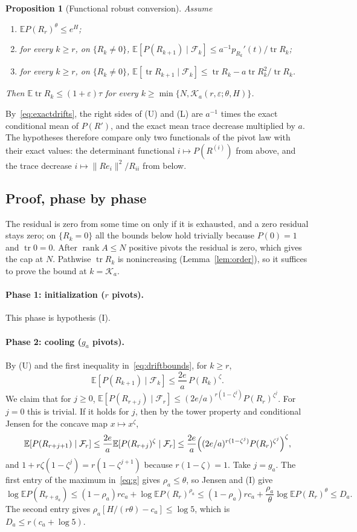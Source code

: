 \documentclass[11pt]{article}
\newtheorem{proposition}[theorem]{Proposition}
\theoremstyle{definition}\newtheorem{definition}[theorem]{Definition}
\theoremstyle{remark}\newtheorem{remark}[theorem]{Remark}
\newcommand{\E}{\mathbb E}
\newcommand{\eps}{\varepsilon}
\newcommand{\tr}{\operatorname{tr}}
\newcommand{\rank}{\operatorname{rank}}
\newcommand{\calK}{\mathcal K}
\newcommand{\calF}{\mathcal F}
\newcommand{\1}{\mathbf 1}
\begin{document}
\begin{proposition}[Functional robust conversion]\label{prop:functional}
Assume
\begin{enumerate}[label=\textup{(\Roman*)},leftmargin=2.2em]
\item[\textup{(I)}] $\E P(R_r)^\theta\le e^H$;
\item[\textup{(U)}] for every $k\ge r$, on $\{R_k\ne0\}$,
 $\E[P(R_{k+1})\mid\calF_k]\le a^{-1}p_{R_k}'(t)/\tr R_k$;
\item[\textup{(L)}] for every $k\ge r$, on $\{R_k\ne0\}$,
 $\E[\tr R_{k+1}\mid\calF_k]\le\tr R_k-a\tr R_k^2/\tr R_k$.
\end{enumerate}
Then $\E\tr R_k\le(1+\eps)\tau$ for every
$k\ge\min\{N,\calK_a(r,\eps;\theta,H)\}$.
\end{proposition}

By~\eqref{eq:exactdrifts}, the right sides of (U) and (L) are $a^{-1}$
times the exact conditional mean of $P(R')$, and the exact mean trace
decrease multiplied by $a$. The hypotheses therefore compare only two
functionals of the pivot law with their exact values: the determinant
functional $i\mapsto P(R^{(i)})$ from above, and the trace decrease
$i\mapsto\|Re_i\|^2/R_{ii}$ from below.

\subsection{Proof, phase by phase}
The residual is zero from some time on only if it is exhausted, and a
zero residual stays zero; on $\{R_k=0\}$ all the bounds below hold
trivially because $P(0)=1$ and $\tr 0=0$. After $\rank A\le N$
positive pivots the residual is zero, which gives the cap at $N$.
Pathwise $\tr R_k$ is nonincreasing (Lemma~\ref{lem:order}), so it
suffices to prove the bound at $k=\calK_a$.

\paragraph{Phase 1: initialization ($r$ pivots).}
This phase is hypothesis (I).

\paragraph{Phase 2: cooling ($g_a$ pivots).}
By (U) and the first inequality in~\eqref{eq:driftbounds}, for $k\ge r$,
\[
 \E[P(R_{k+1})\mid\calF_k]\le\frac{2e}a\,P(R_k)^{\zeta}.
\]
We claim that for $j\ge0$,
$\E[P(R_{r+j})\mid\calF_r]\le(2e/a)^{r(1-\zeta^j)}P(R_r)^{\zeta^j}$.
For $j=0$ this is trivial. If it holds for $j$, then by the tower
property and conditional Jensen for the concave map $x\mapsto x^\zeta$,
\[
 \E[P(R_{r+j+1})\mid\calF_r]
 \le\frac{2e}a\E[P(R_{r+j})^\zeta\mid\calF_r]
 \le\frac{2e}a\Bigl((2e/a)^{r(1-\zeta^j)}P(R_r)^{\zeta^j}\Bigr)^\zeta,
\]
and $1+r\zeta(1-\zeta^j)=r(1-\zeta^{j+1})$ because $r(1-\zeta)=1$.
Take $j=g_a$. The first entry of the maximum in~\eqref{eq:g} gives
$\rho_a\le\theta$, so Jensen and (I) give
\[
 \log\E P(R_{r+g_a})\le(1-\rho_a)rc_a+\log\E P(R_r)^{\rho_a}
 \le(1-\rho_a)rc_a+\frac{\rho_a}\theta\log\E P(R_r)^{\theta}\le D_a .
\]
The second entry gives $\rho_a[H/(r\theta)-c_a]\le\log5$, which is
$D_a\le r(c_a+\log5)$.
\end{document}
